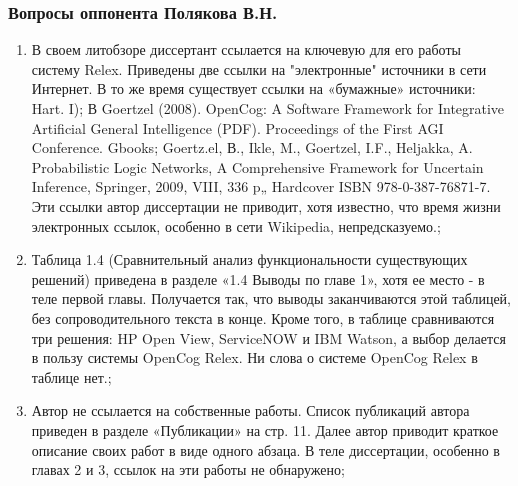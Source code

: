 \documentclass[14pt]{beamer}
\begin{document}
\begin{frame}
\frametitle{Вопросы оппонента Полякова В.Н.}
\begin{enumerate}
\scriptsize 
 

   \item В своем литобзоре диссертант ссылается на ключевую для его работы систему Relex. Приведены две ссылки на "электронные" источники в сети Интернет. В то же время существует ссылки на «бумажные» источники:
Hart. I); В Goertzel (2008). OpenCog: A Software Framework for Integrative Artificial General Intelligence (PDF). Proceedings of the First AGI Conference. Gbooks; Goertz.el, В., Ikle, M., Goertzel, I.F., Heljakka, A. Probabilistic Logic Networks, A Comprehensive Framework for Uncertain Inference, Springer, 2009, VIII, 336 p„ Hardcover ISBN 978-0-387-76871-7.
Эти ссылки автор диссертации не приводит, хотя известно, что время жизни электронных ссылок, особенно в сети Wikipedia, непредсказуемо.;

\item Таблица 1.4 (Сравнительный анализ функциональности существующих решений) приведена в разделе «1.4 Выводы по главе 1», хотя ее место - в теле первой главы. Получается так, что выводы заканчиваются этой таблицей, без сопроводительного текста в конце. Кроме того, в таблице сравниваются три решения: HP Open View, ServiceNOW и IBM Watson, а выбор делается в пользу системы OpenCog Relex. Ни слова о системе OpenCog Relex в таблице нет.;
\item Автор не ссылается на собственные работы. Список публикаций автора приведен в разделе «Публикации» на стр. 11. Далее автор приводит краткое описание своих работ в виде одного абзаца. В теле диссертации, особенно в главах 2 и 3, ссылок на эти работы не обнаружено;
%



\end{enumerate}
\end{frame}
\end{document}
